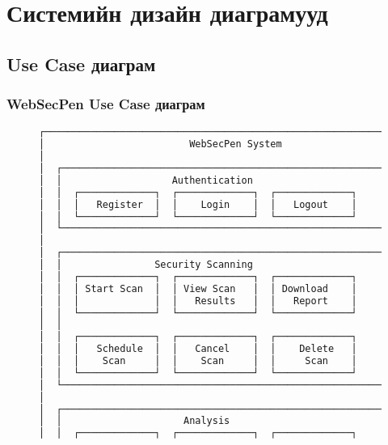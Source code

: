 \documentclass[main.tex]{subfiles}
\begin{document}
\section{Системийн дизайн диаграмууд}

\subsection{Use Case диаграм}

\subsubsection{WebSecPen Use Case диаграм}

\begin{figure}[h]
\centering
\begin{lstlisting}[language=bash, caption=WebSecPen Use Case диаграм]
┌─────────────────────────────────────────────────────────────────┐
│                         WebSecPen System                        │
│                                                                 │
│  ┌─────────────────────────────────────────────────────────┐    │
│  │                   Authentication                        │    │
│  │  ┌─────────────┐  ┌─────────────┐  ┌─────────────┐     │    │
│  │  │   Register  │  │    Login    │  │   Logout    │     │    │
│  │  └─────────────┘  └─────────────┘  └─────────────┘     │    │
│  └─────────────────────────────────────────────────────────┘    │
│                                                                 │
│  ┌─────────────────────────────────────────────────────────┐    │
│  │                Security Scanning                        │    │
│  │  ┌─────────────┐  ┌─────────────┐  ┌─────────────┐     │    │
│  │  │ Start Scan  │  │ View Scan   │  │ Download    │     │    │
│  │  │             │  │   Results   │  │   Report    │     │    │
│  │  └─────────────┘  └─────────────┘  └─────────────┘     │    │
│  │                                                         │    │
│  │  ┌─────────────┐  ┌─────────────┐  ┌─────────────┐     │    │
│  │  │   Schedule  │  │   Cancel    │  │    Delete   │     │    │
│  │  │    Scan     │  │    Scan     │  │     Scan    │     │    │
│  │  └─────────────┘  └─────────────┘  └─────────────┘     │    │
│  └─────────────────────────────────────────────────────────┘    │
│                                                                 │
│  ┌─────────────────────────────────────────────────────────┐    │
│  │                     Analysis                            │    │
│  │  ┌─────────────┐  ┌─────────────┐  ┌─────────────┐     │    │

\end{lstlisting}
\end{figure}
\end{document}
